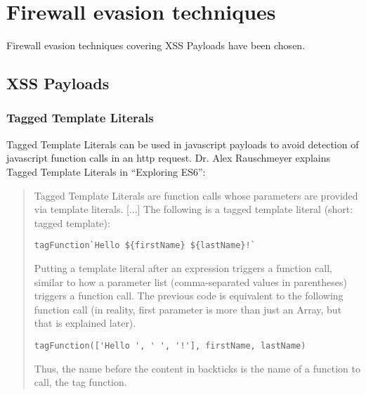 \section{Firewall evasion techniques}
\label{sec:Firewall evasion techniques}

Firewall evasion techniques covering XSS Payloads have been chosen.



\subsection{XSS Payloads}

\subsubsection{Tagged Template Literals}
Tagged Template Literals can be used in javascript payloads to avoid detection of javascript function calls in an http request. Dr. Alex Rauschmeyer explains Tagged Template Literals in ``Exploring ES6'':
\begin{quotation} Tagged Template Literals are function calls whose parameters are provided via template literals. [...]
	The following is a tagged template literal (short: tagged template):
	\begin{lstlisting}
tagFunction`Hello ${firstName} ${lastName}!`
\end{lstlisting}
	Putting a template literal after an expression triggers a function call, similar to how a parameter list (comma-separated values in parentheses) triggers a function call. The previous code is equivalent to the following function call (in reality, first parameter is more than just an Array, but that is explained later).
	\begin{lstlisting}
tagFunction(['Hello ', ' ', '!'], firstName, lastName)
\end{lstlisting}
	Thus, the name before the content in backticks is the name of a function to call, the tag function.
	\cite{exploringes6/templatelit}
\end{quotation}

